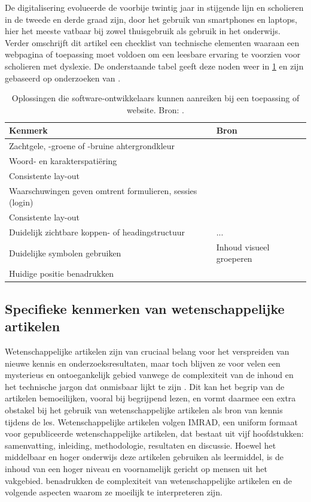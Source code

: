 \medspace

De digitalisering evolueerde de voorbije twintig jaar in stijgende lijn en scholieren in de tweede en derde graad zijn, door het gebruik van smartphones en laptops, hier het meeste vatbaar bij zowel thuisgebruik als gebruik in het onderwijs. Verder omschrijft dit artikel een checklist van technische elementen waaraan een webpagina of toepassing moet voldoen om een leesbare ervaring te voorzien voor scholieren met dyslexie. De onderstaande tabel geeft deze noden weer in \ref{table:dyslexia-necessaries} en zijn gebaseerd op onderzoeken van \textcite{Santana2012}.

\begin{center}
		\begin{table}[H]
	\begin{tabular}{ | m{8cm} | m{8cm} | } 
		\hline
		Kenmerk & Bron \\
		\hline
		Zachtgele, -groene of -bruine ahtergrondkleur & \\ \hline
		Woord- en karakterspatiëring & \\ \hline
		Consistente lay-out & \\ \hline
		Waarschuwingen geven omtrent formulieren, sessies (login) & \\ \hline
		Consistente lay-out & \\ \hline
		Duidelijk zichtbare koppen- of headingstructuur & ... \\ \hline
		Duidelijke symbolen gebruiken & Inhoud visueel groeperen \\ \hline
		Huidige positie benadrukken &  \\ \hline
	\end{tabular}
	\caption{Oplossingen die software-ontwikkelaars kunnen aanreiken bij een toepassing of website. Bron: \autocite{}.}
	\label{table:dyslexia-necessaries}
	\end{table}
\end{center}

\subsection{Specifieke kenmerken van wetenschappelijke artikelen}

Wetenschappelijke artikelen zijn van cruciaal belang voor het verspreiden van nieuwe kennis en onderzoeksresultaten, maar toch blijven ze voor velen een mysterieus en ontoegankelijk gebied vanwege de complexiteit van de inhoud en het technische jargon dat onmisbaar lijkt te zijn \autocite{Ball2017}. Dit kan het begrip van de artikelen bemoeilijken, vooral bij begrijpend lezen, en vormt daarmee een extra obstakel bij het gebruik van wetenschappelijke artikelen als bron van kennis tijdens de les. Wetenschappelijke artikelen volgen IMRAD, een uniform formaat voor gepubliceerde wetenschappelijke artikelen, dat bestaat uit vijf hoofdstukken: samenvatting, inleiding, methodologie, resultaten en discussie. Hoewel het middelbaar en hoger onderwijs deze artikelen gebruiken als leermiddel,  is  de inhoud van een hoger niveau en voornamelijk gericht op mensen uit het vakgebied. \textcite{Pain2016, CAS2021} benadrukken de complexiteit van wetenschappelijke artikelen en de volgende aspecten waarom ze moeilijk te interpreteren zijn.

